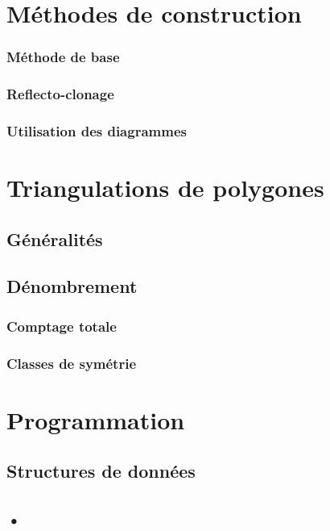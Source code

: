 \documentclass[10pt,a4paper]{article}
\begin{document}
	\section{Méthodes de construction}
		\subsubsection{Méthode de base}
		\subsubsection{Reflecto-clonage}
		\subsubsection{Utilisation des diagrammes}
\section{Triangulations de polygones}
	\subsection{Généralités}
	\subsection{Dénombrement}
		\subsubsection{Comptage totale}
		\subsubsection{Classes de symétrie}

\section{Programmation}
	\subsection{Structures de données}
	\subsection{•}
\end{document}
